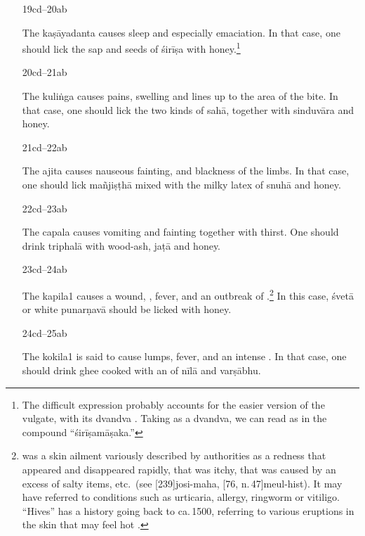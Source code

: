 \begin{translation}
\begin{itemize}
\item[19cd--20ab]

The \Gls{kaṣāyadanta} causes sleep and especially emaciation. 
In that case, one should lick the sap and seeds of \gls{śirīṣa} with 
honey.\footnote{The difficult expression  
probably accounts for the easier version of the vulgate, with its dvandva 
.  Taking  as a dvandva, we can read 
 as in the compound  “\gls{śirīṣamāṣaka}.”}

\item[20cd--21ab]

The \Gls{kuliṅga} causes pains, swelling and lines up to the area of the bite.
In that case, one should lick the two kinds of \gls{sahā}, together with 
\gls{sinduvāra} and honey.  

\item[21cd--22ab]

The \Gls{ajita} causes nauseous fainting,  and 
blackness of the limbs. 
In that case, one should lick \gls{mañjiṣṭhā} mixed with the milky latex of 
\gls{snuhā} and honey. 


\item[22cd--23ab]

The \Gls{capala} causes vomiting and fainting together with thirst.
One should drink \gls{triphalā} with wood-ash, \gls{jaṭā} and 
honey.

\item [23cd--24ab]

The \Gls{kapila1} causes a wound, , fever, and an
outbreak of .\footnote{ was a skin
    ailment variously described by authorities as a redness that appeared
    and disappeared rapidly, that was itchy, that was caused by an excess
    of salty items, etc.\ (see [239]{josi-maha},
    [76, n.\,47]{meul-hist}). It may have referred to
    conditions such as urticaria, allergy, ringworm or vitiligo. “Hives” has a 
    history going back to ca.\,1500, referring to various eruptions in the skin that 
    may feel hot \citep[s.v.\ 
    “\href{https://doi.org/10.1093/OED/3255856400}{hives (n.)}”]{OED}.} In 
    this
    case, \gls{śvetā} or white \gls{punarṇavā} should be licked with
    honey.

\item[24cd--25ab]

The \Gls{kokila1} is said to cause lumps, fever, and an intense 
\se{dāha}{feeling of heat}. 
In that case, one should drink  ghee cooked with an 
of  \gls{nīlā} and \gls{varṣābhu}. 



\end{itemize}
\end{translation}

